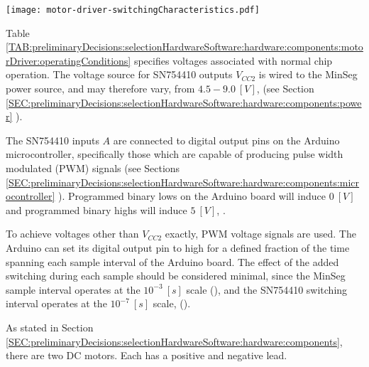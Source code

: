 \documentclass[crop=false,float=true,class=scrreprt]{standalone}
\begin{document}
\vspace*{\fill}

\begin{table}[H]%
\centering%
\caption[{[Selection of Compatible HW \& SW]: Motor Driver Switching Characteristics}]%
        {{[Selection of Compatible HW \& SW]: Motor Driver Switching Characteristics~%
           \cite{REF:online:ti:datasheet:sn754410}%
           \label{TAB:preliminaryDecisions:selectionHardwareSoftware:hardware:components:motorDriver:switchingCharacteristics}%
        }}%
\texttt{[image: motor-driver-switchingCharacteristics.pdf]}%
\end{table}
\vspace*{\fill}




\clearpage




Table~%
\ref{TAB:preliminaryDecisions:selectionHardwareSoftware:hardware:components:motorDriver:operatingConditions}
specifies voltages associated with normal chip operation.
The voltage source for SN754410 outputs $V_{CC2}$ is wired to the MinSeg power source, 
and may therefore vary, from $4.5 - 9.0\ [V]$, {\fns(see Section~%
\ref{SEC:preliminaryDecisions:selectionHardwareSoftware:hardware:components:power}%
)}.

The SN754410 inputs $A$ are connected to digital output pins on the Arduino microcontroller, 
specifically those which are capable of producing pulse width modulated (PWM) signals
{\fns(see Sections~%
\ref{SEC:preliminaryDecisions:selectionHardwareSoftware:hardware:components:microcontroller}%
)}.
Programmed binary lows on the Arduino board will induce $0\ [V]$ 
and programmed binary highs will induce $5\ [V]$,
{}.


To achieve voltages other than $V_{CC2}$ exactly,
PWM voltage signals are used.
The Arduino can set its digital output pin to high
for a defined fraction of the time spanning
each sample interval of the Arduino board.
The effect of the added switching during each sample should be considered minimal,
since the MinSeg sample interval operates at the $10^{-3}\ [s]$ scale
{\fns()},
and the SN754410 switching interval operates at the $10^{-7}\ [s]$ scale,
{\fns()}.

As stated in Section~%
\ref{SEC:preliminaryDecisions:selectionHardwareSoftware:hardware:components},
there are two DC motors.  
Each has a positive and negative lead.




\clearpage
\end{document}
